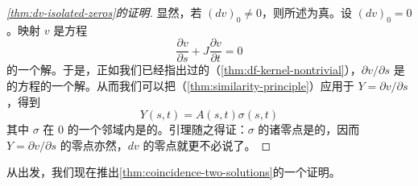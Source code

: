 \begin{proof}[\cref{thm:dv-isolated-zeros}的证明]
显然，若 $(dv)_0\neq 0$，则所述为真。设 $(dv)_0=0$。映射 $v$ 是方程
\[
\frac{\partial v}{\partial s}+J\frac{\partial v}{\partial t}=0
\]
的一个解。于是，正如我们已经指出过的（\cref{thm:df-kernel-nontrivial}），$\partial v/\partial s$ 是\trLinearization{}的\trCauchyRiemann{}方程的一个解。从而我们可以把\trSimilarityPrinciple（\cref{thm:similarity-principle}）应用于 $Y=\partial v/\partial s$，得到
\[
Y(s,t)=A(s,t)\sigma(s,t)
\]
其中 $\sigma$ 在 $0$ 的一个邻域内是\trHolomorphic{}的。引理随之得证：$\sigma$ 的诸零点是\trIsolated{}的，因而 $Y=\partial v/\partial s$ 的零点亦然，$dv$ 的零点就更不必说了。
\end{proof}

从\trContinuationPrinciple{}出发，我们现在推出\cref{thm:coincidence-two-solutions}的一个证明。

